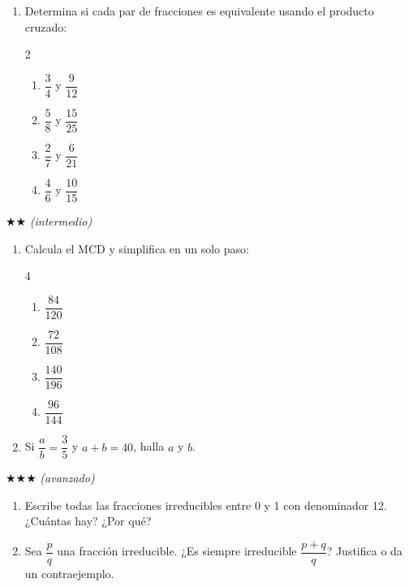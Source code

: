 \documentclass[11pt, letterpaper]{article}
\begin{document}
\begin{enumerate}[label=\textbf{\arabic*.}, leftmargin=*]
\item Determina si cada par de fracciones es equivalente usando el producto cruzado:
\begin{multicols}{2}
\begin{enumerate}[label=\alph*)]
  \item $\dfrac{3}{4}$ y $\dfrac{9}{12}$ \item $\dfrac{5}{8}$ y $\dfrac{15}{25}$
  \item $\dfrac{2}{7}$ y $\dfrac{6}{21}$ \item $\dfrac{4}{6}$ y $\dfrac{10}{15}$
\end{enumerate}
\end{multicols}

\end{enumerate}

$\bigstar\bigstar$ \textit{(intermedio)}

\begin{enumerate}[label=\textbf{\arabic*.}, leftmargin=*, resume]

\item Calcula el MCD y simplifica en un solo paso:
\begin{multicols}{4}
\begin{enumerate}[label=\alph*)]
  \item $\dfrac{84}{120}$ \item $\dfrac{72}{108}$ \item $\dfrac{140}{196}$ \item $\dfrac{96}{144}$
\end{enumerate}
\end{multicols}

\item Si $\dfrac{a}{b} = \dfrac{3}{5}$ y $a + b = 40$, halla $a$ y $b$.

\end{enumerate}

$\bigstar\bigstar\bigstar$ \textit{(avanzado)}

\begin{enumerate}[label=\textbf{\arabic*.}, leftmargin=*, resume]

\item Escribe todas las fracciones irreducibles entre 0 y 1 con denominador 12. ¿Cu\'antas hay? ¿Por qu\'e?

\item Sea $\dfrac{p}{q}$ una fracci\'on irreducible. ¿Es siempre irreducible $\dfrac{p+q}{q}$? Justifica o da un contraejemplo.

\end{enumerate}
\end{document}
